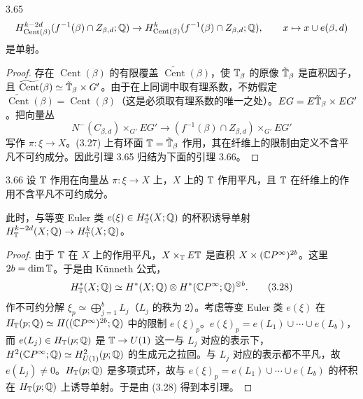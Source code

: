 \begin{lemma*}{3.65}
  \[
    H^{k-2d}_{\operatorname{Cent}(\beta)}(f^{-1}(\beta)\cap Z_{\beta,d};\mathbb{Q})
    \to H^k_{\operatorname{Cent}(\beta)}(f^{-1}(\beta)\cap Z_{\beta,d};\mathbb{Q}),\qquad
    x\mapsto x\cup e(\beta,d)
  \]
  是单射。
\end{lemma*}

\begin{proof}
  存在 $\operatorname{Cent}(\beta)$ 的有限覆盖 $\widetilde{\operatorname{Cent}}(\beta)$，使 $\mathbb{T}_\beta$ 的原像 $\tilde{\mathbb{T}}_\beta$ 是直积因子，且 $\widetilde{\operatorname{Cent}}(\beta)\simeq\tilde{\mathbb{T}}_\beta\times G'$。由于在上同调中取有理系数，不妨假定 $\widetilde{\operatorname{Cent}}(\beta)=\operatorname{Cent}(\beta)$（这是必须取有理系数的唯一之处）。$EG=E\tilde{\mathbb{T}}_\beta\times EG'$。把向量丛
  \begin{equation}
    N^-(C_{\beta,d})\times_{G'}EG'\to(f^{-1}(\beta)\cap Z_{\beta,d})\times_{G'}EG' \tag{3.27}
  \end{equation}
  写作 $\pi\colon\xi\to X$。(3.27) 上有环面 $\mathbb{T}=\tilde{\mathbb{T}}_\beta$ 作用，其在纤维上的限制由定义不含平凡不可约成分。因此引理 3.65 归结为下面的引理 3.66。

\end{proof}

\begin{lemma*}{3.66}
  设 $\mathbb{T}$ 作用在向量丛 $\pi\colon\xi\to X$ 上，$X$ 上的 $\mathbb{T}$ 作用平凡，且 $\mathbb{T}$ 在纤维上的作用不含平凡不可约成分。

  此时，与等变 Euler 类 $e(\xi)\in H^*_{\mathbb{T}}(X;\mathbb{Q})$ 的杯积诱导单射 $H^{k-2d}_{\mathbb{T}}(X;\mathbb{Q})\to H^k_{\mathbb{T}}(X;\mathbb{Q})$。
\end{lemma*}

\begin{proof}
  由于 $\mathbb{T}$ 在 $X$ 上的作用平凡，$X\times_{\mathbb{T}} E\mathbb{T}$ 是直积 $X\times(\mathbb{C}P^\infty)^{2b}$。这里 $2b=\dim\mathbb{T}$。于是由 Künneth 公式，
  \begin{equation}
    H^*_{\mathbb{T}}(X;\mathbb{Q})\simeq H^*(X;\mathbb{Q})\otimes H^*(\mathbb{C}P^\infty;\mathbb{Q})^{\otimes b}. \tag{3.28}
  \end{equation}
  作不可约分解 $\xi_p\simeq\bigoplus_{j=1}^bL_j$（$L_j$ 的秩为 2）。考虑等变 Euler 类 $e(\xi)$ 在 $H_{\mathbb{T}}(p;\mathbb{Q})\simeq H((\mathbb{C}P^\infty)^{2b};\mathbb{Q})$ 中的限制 $e(\xi)_p$。$e(\xi)_p=e(L_1)\cup\cdots\cup e(L_b)$，而 $e(L_j)\in H_{\mathbb{T}}(p;\mathbb{Q})$ 是 $\mathbb{T}\to U(1)$ 这一与 $L_j$ 对应的表示下，$H^2(\mathbb{C}P^\infty;\mathbb{Q})\simeq H^2_{U(1)}(p;\mathbb{Q})$ 的生成元之拉回。与 $L_j$ 对应的表示都不平凡，故 $e(L_j)\neq0$。$H_{\mathbb{T}}(p;\mathbb{Q})$ 是多项式环，故与 $e(\xi)_p=e(L_1)\cup\cdots\cup e(L_b)$ 的杯积在 $H_{\mathbb{T}}(p;\mathbb{Q})$ 上诱导单射。于是由 (3.28) 得到本引理。
\end{proof}

